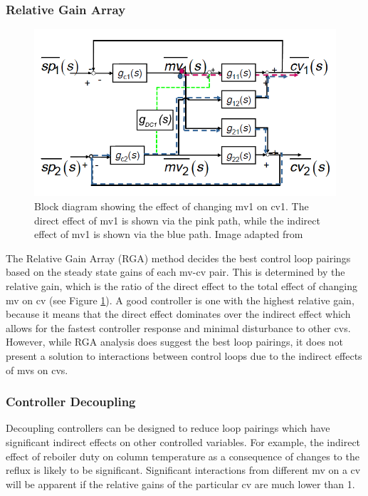 \subsubsection{Relative Gain Array}

\begin{figure}
    \centering
    \includegraphics[width=\linewidth]{chapters/4-operation-control/4-Figures/RGA-Thornhill-2013.png}
    \caption{Block diagram showing the effect of changing mv1 on cv1. The direct effect of mv1 is shown via the pink path, while the indirect effect of mv1 is shown via the blue path. Image adapted from \textcite{}}
    \label{fig:RGA-block-di}
\end{figure}

The Relative Gain Array (RGA) method decides the best control loop pairings based on the steady state gains of each mv-cv pair. This is determined by the relative gain, which is the ratio of the direct effect to the total effect of changing mv on cv (see Figure \ref{fig:RGA-block-di}). A good controller is one with the highest relative gain, because it means that the direct effect dominates over the indirect effect which allows for the fastest controller response and minimal disturbance to other cvs. However, while RGA analysis does suggest the best loop pairings, it does not present a solution to interactions between control loops due to the indirect effects of mvs on cvs.

\subsubsection{Controller Decoupling}
Decoupling controllers can be designed to reduce loop pairings which have significant indirect effects on other controlled variables. For example, the indirect effect of reboiler duty on column temperature as a consequence of changes to the reflux is likely to be significant. Significant interactions from different mv on a cv will be apparent if the relative gains of the particular cv are much lower than 1. 

